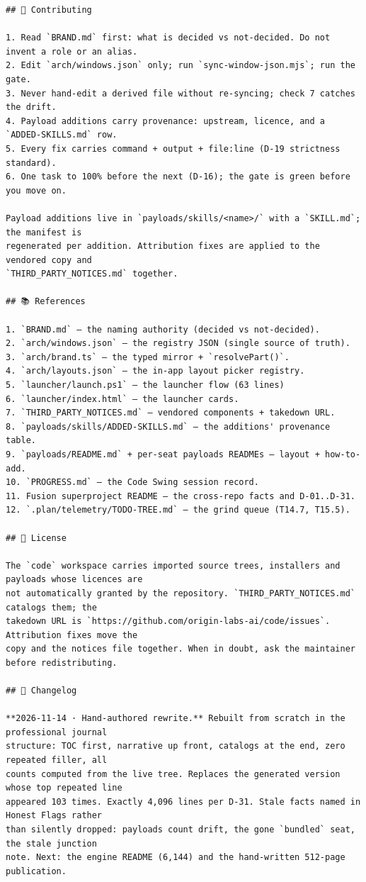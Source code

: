 \begin{Verbatim}[breaklines,breakanywhere,fontsize=\footnotesize]
## 🤝 Contributing

1. Read `BRAND.md` first: what is decided vs not-decided. Do not invent a role or an alias.
2. Edit `arch/windows.json` only; run `sync-window-json.mjs`; run the gate.
3. Never hand-edit a derived file without re-syncing; check 7 catches the drift.
4. Payload additions carry provenance: upstream, licence, and a `ADDED-SKILLS.md` row.
5. Every fix carries command + output + file:line (D-19 strictness standard).
6. One task to 100% before the next (D-16); the gate is green before you move on.

Payload additions live in `payloads/skills/<name>/` with a `SKILL.md`; the manifest is
regenerated per addition. Attribution fixes are applied to the vendored copy and
`THIRD_PARTY_NOTICES.md` together.

## 📚 References

1. `BRAND.md` — the naming authority (decided vs not-decided).
2. `arch/windows.json` — the registry JSON (single source of truth).
3. `arch/brand.ts` — the typed mirror + `resolvePart()`.
4. `arch/layouts.json` — the in-app layout picker registry.
5. `launcher/launch.ps1` — the launcher flow (63 lines)
6. `launcher/index.html` — the launcher cards.
7. `THIRD_PARTY_NOTICES.md` — vendored components + takedown URL.
8. `payloads/skills/ADDED-SKILLS.md` — the additions' provenance table.
9. `payloads/README.md` + per-seat payloads READMEs — layout + how-to-add.
10. `PROGRESS.md` — the Code Swing session record.
11. Fusion superproject README — the cross-repo facts and D-01..D-31.
12. `.plan/telemetry/TODO-TREE.md` — the grind queue (T14.7, T15.5).

## 📜 License

The `code` workspace carries imported source trees, installers and payloads whose licences are
not automatically granted by the repository. `THIRD_PARTY_NOTICES.md` catalogs them; the
takedown URL is `https://github.com/origin-labs-ai/code/issues`. Attribution fixes move the
copy and the notices file together. When in doubt, ask the maintainer before redistributing.

## 📝 Changelog

**2026-11-14 · Hand-authored rewrite.** Rebuilt from scratch in the professional journal
structure: TOC first, narrative up front, catalogs at the end, zero repeated filler, all
counts computed from the live tree. Replaces the generated version whose top repeated line
appeared 103 times. Exactly 4,096 lines per D-31. Stale facts named in Honest Flags rather
than silently dropped: payloads count drift, the gone `bundled` seat, the stale junction
note. Next: the engine README (6,144) and the hand-written 512-page publication.


\end{Verbatim}
